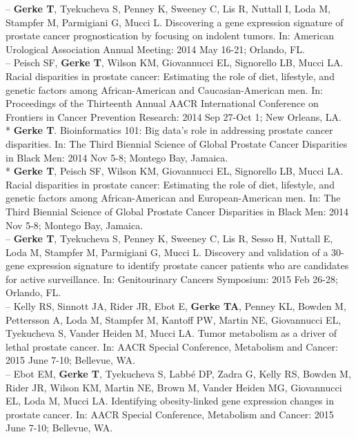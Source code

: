 \documentclass[11pt, a4paper]{article} %
\begin{document}
-- {\bf Gerke T}, Tyekucheva S, Penney K, Sweeney C, Lis R, Nuttall I, Loda M, Stampfer M, Parmigiani G, Mucci L. Discovering a gene expression signature of prostate cancer prognostication by focusing on indolent tumors. In: American Urological Association Annual Meeting: 2014 May 16-21; Orlando, FL.\\

-- Peisch SF, {\bf Gerke T}, Wilson KM, Giovannucci EL, Signorello LB, Mucci LA. Racial disparities in prostate cancer: Estimating the role of diet, lifestyle, and genetic factors among African-American and Caucasian-American men. In: Proceedings of the Thirteenth Annual AACR International Conference on Frontiers in Cancer Prevention Research: 2014 Sep 27-Oct 1; New Orleans, LA.\\

* {\bf Gerke T}. Bioinformatics 101: Big data's role in addressing prostate cancer disparities. In: The Third Biennial Science of Global Prostate Cancer Disparities in Black Men: 2014 Nov 5-8; Montego Bay, Jamaica.\\

* {\bf Gerke T}, Peisch SF, Wilson KM, Giovannucci EL, Signorello LB, Mucci LA. Racial disparities in prostate cancer: Estimating the role of diet, lifestyle, and genetic factors among African-American and European-American men. In: The Third Biennial Science of Global Prostate Cancer Disparities in Black Men: 2014 Nov 5-8; Montego Bay, Jamaica.\\

-- {\bf Gerke T}, Tyekucheva S, Penney K, Sweeney C, Lis R, Sesso H, Nuttall E, Loda M, Stampfer M, Parmigiani G, Mucci L. Discovery and validation of a 30-gene expression signature to identify prostate cancer patients who are candidates for active surveillance. In: Genitourinary Cancers Symposium: 2015 Feb 26-28; Orlando, FL.\\

-- Kelly RS, Sinnott JA, Rider JR, Ebot E, {\bf Gerke TA}, Penney KL, Bowden M, Pettersson A, Loda M, Stampfer M, Kantoff PW, Martin NE, Giovannucci EL, Tyekucheva S, Vander Heiden M, Mucci LA. Tumor metabolism as a driver of lethal prostate cancer. In: AACR Special Conference, Metabolism and Cancer: 2015 June 7-10; Bellevue, WA.\\

-- Ebot EM, {\bf Gerke T}, Tyekucheva S, Labb\'{e} DP, Zadra G, Kelly RS, Bowden M, Rider JR, Wilson KM, Martin NE, Brown M, Vander Heiden MG, Giovannucci EL, Loda M, Mucci LA. Identifying obesity-linked gene expression changes in prostate cancer. In: AACR Special Conference, Metabolism and Cancer: 2015 June 7-10; Bellevue, WA.\\
\end{document}
